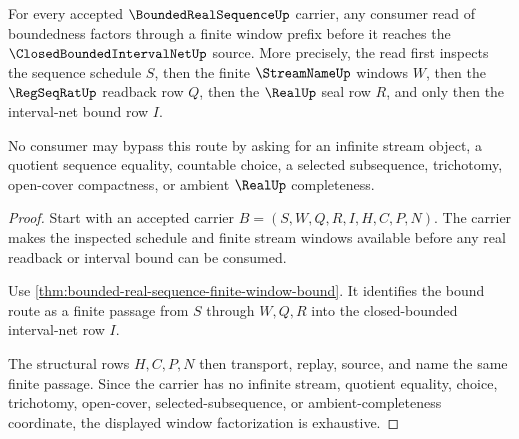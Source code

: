 \begin{theorem}
\label{thm:bounded-real-sequence-window-factorization}
For every accepted $\BoundedRealSequenceUp$ carrier, any consumer read of boundedness factors through a finite window prefix before it reaches the $\ClosedBoundedIntervalNetUp$ source. More precisely, the read first inspects the sequence schedule $S$, then the finite $\StreamNameUp$ windows $W$, then the $\RegSeqRatUp$ readback row $Q$, then the $\RealUp$ seal row $R$, and only then the interval-net bound row $I$.

No consumer may bypass this route by asking for an infinite stream object, a quotient sequence equality, countable choice, a selected subsequence, trichotomy, open-cover compactness, or ambient $\RealUp$ completeness.
\end{theorem}
\begin{proof}
Start with an accepted carrier $B=(S,W,Q,R,I,H,C,P,N)$. The carrier makes the inspected schedule and finite stream windows available before any real readback or interval bound can be consumed.

Use \autoref{thm:bounded-real-sequence-finite-window-bound}. It identifies the bound route as a finite passage from $S$ through $W,Q,R$ into the closed-bounded interval-net row $I$.

The structural rows $H,C,P,N$ then transport, replay, source, and name the same finite passage. Since the carrier has no infinite stream, quotient equality, choice, trichotomy, open-cover, selected-subsequence, or ambient-completeness coordinate, the displayed window factorization is exhaustive.
\end{proof}

